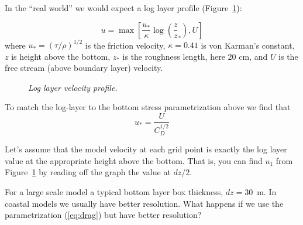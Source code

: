 \clearpage

In the ``real world'' we would expect a log layer profile (Figure~\ref{plt:loglayer}):

\begin{equation}
u = \max \left[ \frac {u_*}{\kappa} \log \left( \frac z z_* \right), U \right]
\end{equation}
where $u_* = (\tau/\rho)^{1/2}$ is the friction velocity, $\kappa =
0.41$ is von Karman's constant, $z$ is height above the bottom, $z_*$
is the roughness length, here 20 cm, and $U$ is the free stream (above boundary layer) velocity.

\begin{figure}[ht]
\caption{\protect\it{Log layer velocity profile.}}
\label{plt:loglayer}
\end{figure}

To match the log-layer to the bottom stress parametrization above we
find that 
\begin{equation}
u_* = \frac U {C_D^{1/2}}
\end{equation}

Let's assume that the model velocity at each grid point is exactly the log
layer value at the appropriate height above the bottom.  That is, you can
find $u_1$ from Figure~\ref{plt:loglayer} by reading off the graph the
value at $dz/2$.

For a large scale model a  typical bottom layer box thickness, $dz =
30$~m.  In coastal models we usually have better resolution.  What
happens if we use the parametrization (\ref{eq:drag}) but have better resolution?

\clearpage

